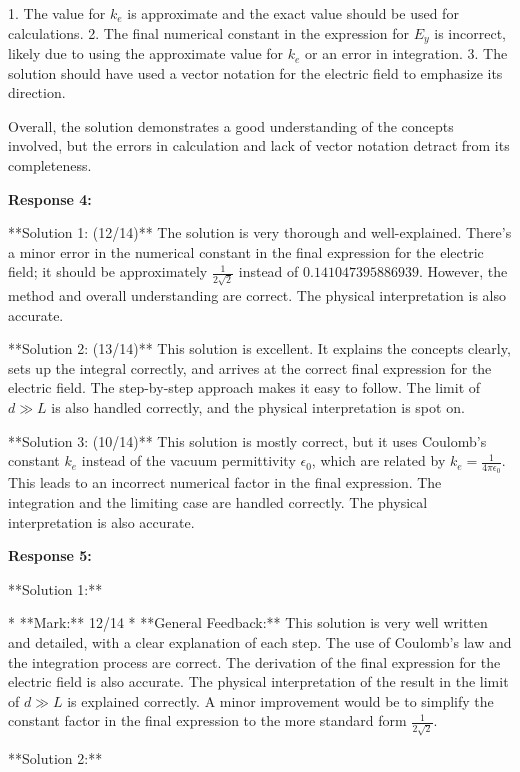 \documentclass[a4paper,11pt]{article}
\begin{document}
1. The value for \( k_e \) is approximate and the exact value should be used for calculations.
2. The final numerical constant in the expression for \( E_y \) is incorrect, likely due to using the approximate value for \( k_e \) or an error in integration.
3. The solution should have used a vector notation for the electric field to emphasize its direction. 

Overall, the solution demonstrates a good understanding of the concepts involved, but the errors in calculation and lack of vector notation detract from its completeness.

\bigskip    
\textbf{Response 4:}

**Solution 1: (12/14)**
The solution is very thorough and well-explained. There's a minor error in the numerical constant in the final expression for the electric field; it should be approximately \( \frac{1}{2\sqrt{2}} \) instead of \( 0.141047395886939 \). However, the method and overall understanding are correct. The physical interpretation is also accurate.

**Solution 2: (13/14)**
This solution is excellent. It explains the concepts clearly, sets up the integral correctly, and arrives at the correct final expression for the electric field. The step-by-step approach makes it easy to follow. The limit of \( d \gg L \) is also handled correctly, and the physical interpretation is spot on.

**Solution 3: (10/14)**
This solution is mostly correct, but it uses Coulomb's constant \( k_e \) instead of the vacuum permittivity \( \epsilon_0 \), which are related by \( k_e = \frac{1}{4\pi\epsilon_0} \). This leads to an incorrect numerical factor in the final expression. The integration and the limiting case are handled correctly. The physical interpretation is also accurate.

\bigskip    
\textbf{Response 5:}

**Solution 1:**

* **Mark:** 12/14
* **General Feedback:** This solution is very well written and detailed, with a clear explanation of each step. The use of Coulomb's law and the integration process are correct. The derivation of the final expression for the electric field is also accurate. The physical interpretation of the result in the limit of \( d \gg L \) is explained correctly.  A minor improvement would be to simplify the constant factor in the final expression to the more standard form \( \frac{1}{2\sqrt{2}} \).

**Solution 2:**
\end{document}
